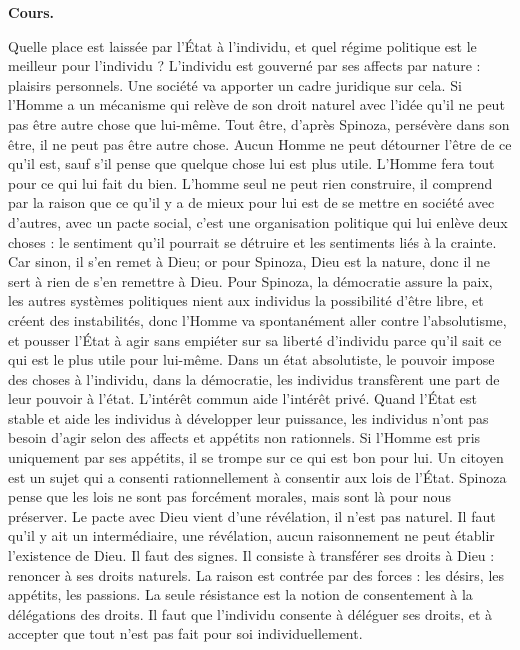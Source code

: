\documentclass[11pt]{article}
\begin{document}
\bf{Cours.}

Quelle place est laissée par l'État à l'individu, et quel régime politique est le meilleur pour l'individu ? L'individu est gouverné par ses affects par nature : plaisirs personnels. Une société va apporter un cadre juridique sur cela. Si l'Homme a un mécanisme qui relève de son droit naturel avec l'idée qu'il ne peut pas être autre chose que lui-même. Tout être, d'après Spinoza, persévère dans son être, il ne peut pas être autre chose. Aucun Homme ne peut détourner l'être de ce qu'il est, sauf s'il pense que quelque chose lui est plus utile. L'Homme fera tout pour ce qui lui fait du bien. L'homme seul ne peut rien construire, il comprend par la raison que ce qu'il y a de mieux pour lui est de se mettre en société avec d'autres, avec un pacte social, c'est une organisation politique qui lui enlève deux choses : le sentiment qu'il pourrait se détruire et les sentiments liés à la crainte. Car sinon, il s'en remet à Dieu; or pour Spinoza, Dieu est la nature, donc il ne sert à rien de s'en remettre à Dieu. Pour Spinoza, la démocratie assure la paix, les autres systèmes politiques nient aux individus la possibilité d'être libre, et créent des instabilités, donc l'Homme va spontanément aller contre l'absolutisme, et pousser l'État à agir sans empiéter sur sa liberté d'individu parce qu'il sait ce qui est le plus utile pour lui-même. Dans un état absolutiste, le pouvoir impose des choses à l'individu, dans la démocratie, les individus transfèrent une part de leur pouvoir à l'état. L'intérêt commun aide l'intérêt privé. Quand l'État est stable et aide les individus à développer leur puissance, les individus n'ont pas besoin d'agir selon des affects et appétits non rationnels. Si l'Homme est pris uniquement par ses appétits, il se trompe sur ce qui est bon pour lui. 
Un citoyen est un sujet qui a consenti rationnellement à consentir aux lois de l'État. Spinoza pense que les lois ne sont pas forcément morales, mais sont là pour nous préserver.
Le pacte avec Dieu vient d'une révélation, il n'est pas naturel. Il faut qu'il y ait un intermédiaire, une révélation, aucun raisonnement ne peut établir l'existence de Dieu. Il faut des signes. Il consiste à transférer ses droits à Dieu : renoncer à ses droits naturels.
La raison est contrée par des forces : les désirs, les appétits, les passions. La seule résistance est la notion de consentement à la délégations des droits. Il faut que l'individu consente à déléguer ses droits, et à accepter que tout n'est pas fait pour soi individuellement.
\end{document}

